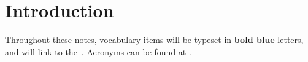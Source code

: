 \section{Introduction}\label{sec:introduction}

Throughout these notes, vocabulary items will be typeset in
\textbf{\textcolor{__glossary_entry_color}{bold blue}} letters, and will link
to the~. Acronyms can be found at .
